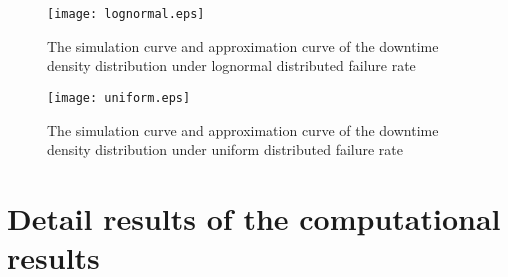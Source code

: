 \documentclass[preprint,12pt]{elsarticle}
\begin{document}
\begin{appendices}
\begin{figure}
\centering
\texttt{[image: lognormal.eps]}
 \caption{The simulation curve and approximation curve of the downtime density distribution under lognormal distributed failure rate}
 \label{fig:lognormal}
\end{figure}


\begin{figure}
\centering
\texttt{[image: uniform.eps]}
 \caption{The simulation curve and approximation curve of the downtime density distribution under uniform distributed failure rate}
  \label{fig:uniform}
\end{figure}

\end{appendices}

\section{Detail results of the computational results}
\end{document}
